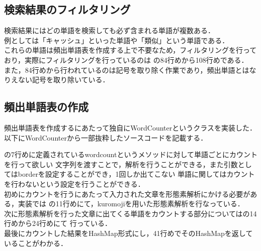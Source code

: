 \subsection{検索結果のフィルタリング}
検索結果にはどの単語を検索しても必ず含まれる単語が複数ある．\\
例としては「キャッシュ」といった単語や「類似」という単語である．\\
これらの単語は頻出単語表を作成する上で不要なため，フィルタリングを行っており，実際にフィルタリングを行っているのは
の84行めから108行めである．
また，84行めから行われているのは記号を取り除く作業であり，頻出単語とはなりえない記号を取り除いている．\\

\subsection{頻出単語表の作成}
頻出単語表を作成するにあたって独自にWordCounterというクラスを実装した．\\

以下にWordCounterから一部抜粋したソースコードを記載する．



の7行めに定義されているwordcountというメソッドに対して単語ごとにカウントを行って欲しい
文字列を渡すことで，解析を行うことができる，また引数としてはborderを設定することができ，1回しか出てこない
単語に関してはカウントを行わないという設定を行うことができる．\\

初めにカウントを行うにあたって入力された文章を形態素解析にかける必要がある，実装では
の11行めにて，kuromojiを用いた形態素解析を行なっている．
\\

次に形態素解析を行った文章に出てくる単語をカウントする部分についてはの14行めから24行めにて
行っている．
\\

最後にカウントした結果をHashMap形式にし，41行めでそのHashMapを返していることがわかる．
\\

